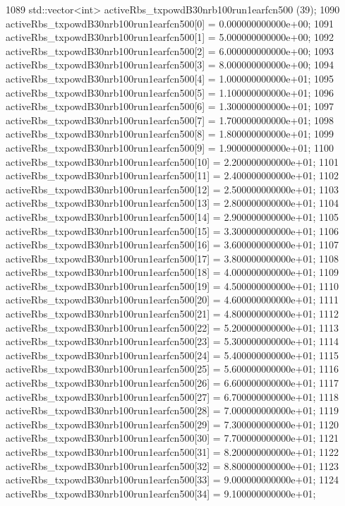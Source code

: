 \begin{DoxyCode}
1089   std::vector<int> activeRbs\_txpowdB30nrb100run1earfcn500 (39);
1090   activeRbs\_txpowdB30nrb100run1earfcn500[0] = 0.000000000000e+00;
1091   activeRbs\_txpowdB30nrb100run1earfcn500[1] = 5.000000000000e+00;
1092   activeRbs\_txpowdB30nrb100run1earfcn500[2] = 6.000000000000e+00;
1093   activeRbs\_txpowdB30nrb100run1earfcn500[3] = 8.000000000000e+00;
1094   activeRbs\_txpowdB30nrb100run1earfcn500[4] = 1.000000000000e+01;
1095   activeRbs\_txpowdB30nrb100run1earfcn500[5] = 1.100000000000e+01;
1096   activeRbs\_txpowdB30nrb100run1earfcn500[6] = 1.300000000000e+01;
1097   activeRbs\_txpowdB30nrb100run1earfcn500[7] = 1.700000000000e+01;
1098   activeRbs\_txpowdB30nrb100run1earfcn500[8] = 1.800000000000e+01;
1099   activeRbs\_txpowdB30nrb100run1earfcn500[9] = 1.900000000000e+01;
1100   activeRbs\_txpowdB30nrb100run1earfcn500[10] = 2.200000000000e+01;
1101   activeRbs\_txpowdB30nrb100run1earfcn500[11] = 2.400000000000e+01;
1102   activeRbs\_txpowdB30nrb100run1earfcn500[12] = 2.500000000000e+01;
1103   activeRbs\_txpowdB30nrb100run1earfcn500[13] = 2.800000000000e+01;
1104   activeRbs\_txpowdB30nrb100run1earfcn500[14] = 2.900000000000e+01;
1105   activeRbs\_txpowdB30nrb100run1earfcn500[15] = 3.300000000000e+01;
1106   activeRbs\_txpowdB30nrb100run1earfcn500[16] = 3.600000000000e+01;
1107   activeRbs\_txpowdB30nrb100run1earfcn500[17] = 3.800000000000e+01;
1108   activeRbs\_txpowdB30nrb100run1earfcn500[18] = 4.000000000000e+01;
1109   activeRbs\_txpowdB30nrb100run1earfcn500[19] = 4.500000000000e+01;
1110   activeRbs\_txpowdB30nrb100run1earfcn500[20] = 4.600000000000e+01;
1111   activeRbs\_txpowdB30nrb100run1earfcn500[21] = 4.800000000000e+01;
1112   activeRbs\_txpowdB30nrb100run1earfcn500[22] = 5.200000000000e+01;
1113   activeRbs\_txpowdB30nrb100run1earfcn500[23] = 5.300000000000e+01;
1114   activeRbs\_txpowdB30nrb100run1earfcn500[24] = 5.400000000000e+01;
1115   activeRbs\_txpowdB30nrb100run1earfcn500[25] = 5.600000000000e+01;
1116   activeRbs\_txpowdB30nrb100run1earfcn500[26] = 6.600000000000e+01;
1117   activeRbs\_txpowdB30nrb100run1earfcn500[27] = 6.700000000000e+01;
1118   activeRbs\_txpowdB30nrb100run1earfcn500[28] = 7.000000000000e+01;
1119   activeRbs\_txpowdB30nrb100run1earfcn500[29] = 7.300000000000e+01;
1120   activeRbs\_txpowdB30nrb100run1earfcn500[30] = 7.700000000000e+01;
1121   activeRbs\_txpowdB30nrb100run1earfcn500[31] = 8.200000000000e+01;
1122   activeRbs\_txpowdB30nrb100run1earfcn500[32] = 8.800000000000e+01;
1123   activeRbs\_txpowdB30nrb100run1earfcn500[33] = 9.000000000000e+01;
1124   activeRbs\_txpowdB30nrb100run1earfcn500[34] = 9.100000000000e+01;

\end{DoxyCode}

